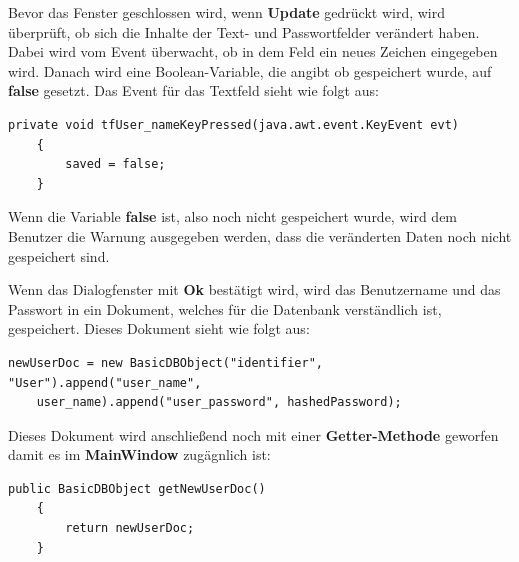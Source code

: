 \vspace{10pt}

Bevor das Fenster geschlossen wird, wenn \textbf{Update} gedrückt wird, wird überprüft, ob sich die Inhalte der Text- und Passwortfelder verändert haben. Dabei wird vom Event überwacht, ob in dem Feld ein neues Zeichen eingegeben wird. Danach wird eine Boolean-Variable, die angibt ob gespeichert wurde, auf \textbf{false} gesetzt. Das Event für das Textfeld sieht wie folgt aus:
\begin{lstlisting}[style=Javastyle, caption=Textfeld Event]
private void tfUser_nameKeyPressed(java.awt.event.KeyEvent evt)                                       
    {                                           
        saved = false;
    }
\end{lstlisting}
Wenn die Variable \textbf{false} ist, also noch nicht gespeichert wurde, wird dem Benutzer die Warnung ausgegeben werden, dass die veränderten Daten noch nicht gespeichert sind.

\vspace{10pt}

Wenn das Dialogfenster mit \textbf{Ok} bestätigt wird, wird das Benutzername und das Passwort in ein Dokument, welches für die Datenbank verständlich ist, gespeichert. Dieses Dokument sieht wie folgt aus:
\begin{lstlisting}[style=Javastyle, caption=Benutzerdokument]
newUserDoc = new BasicDBObject("identifier", "User").append("user_name", 
	user_name).append("user_password", hashedPassword);
\end{lstlisting}

Dieses Dokument wird anschließend noch mit einer \textbf{Getter-Methode} geworfen damit es im \textbf{MainWindow} zugägnlich ist:
\begin{lstlisting}[style=Javastyle, caption=Benutzerdokument Getter-Methode]
public BasicDBObject getNewUserDoc()
    {
        return newUserDoc;
    }
\end{lstlisting}

